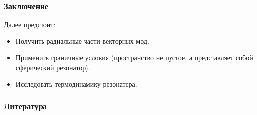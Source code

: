\documentclass{beamer}
\begin{document}
    \begin{frame}\frametitle{Заключение}

        Далее предстоит:
        \begin{itemize}
            \item Получить радиальные части векторных мод.

            \item Применить граничные условия (пространство не пустое, а представляет собой сферический резонатор).

            \item Исследовать термодинамику резонатора.
        \end{itemize}

    \end{frame}


    \begin{frame}\frametitle{Литература}
        
        
    \end{frame}
\end{document}
